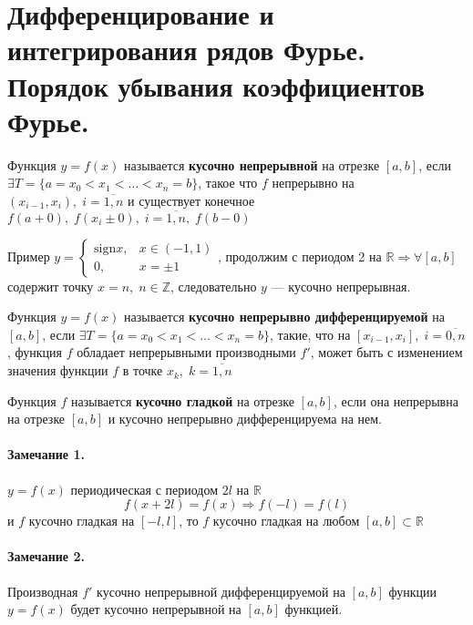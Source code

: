 \section{Дифференцирование и интегрирования рядов Фурье. Порядок убывания коэффициентов Фурье.}
\begin{greyDefinition}Функция $ y = f(x) $ называется \textbf{кусочно непрерывной} на отрезке $ [a,b] $, если $ \exists T = \{ a =x_0<x_1<\ldots<x_n=b \} $, такое что $ f $ непрерывно на $ (x_{i-1},x_i),\;i =\overline{1,n} $ и существует конечное $ f(a+0),\; f(x_i \pm 0),\; i =\overline{1,n},\; f(b-0) $
\end{greyDefinition}

Пример $y =  \begin{cases}
\text{sign}x, &x \in (-1,1)\\
0, &x = \pm 1 
\end{cases} $, продолжим с периодом 2 на $ \mathbb{R} \Rightarrow \forall [a,b]  $ содержит точку $ x = n,\; n \in \mathbb{Z} $, следовательно $ y $ --- кусочно непрерывная.

\begin{greyDefinition} Функция  $ y=f(x) $ называется \textbf{кусочно непрерывно дифференцируемой} на $ [a,b] $, если $ \exists T=\{ a=x_0<x_1<\ldots<x_n=b \} $, такие, что на $ [x_{i-1},x_i],\;i=\overline{0,n} $, функция $ f $ обладает непрерывными производными $ f' $, может быть с изменением значения функции $ f $ в точке $ x_k,\;k=\overline{1,n} $
\end{greyDefinition}
\begin{greyDefinition} Функция $ f $ называется \textbf{кусочно гладкой} на отрезке $ [a,b] $, если она непрерывна на отрезке $ [a,b] $ и кусочно непрерывно дифференцируема на нем.
\end{greyDefinition}

\paragraph{Замечание 1.} $ y=f(x) $ периодическая с периодом $ 2l $ на $ \mathbb{R} $
\[
	f(x+2l)=f(x) \Rightarrow f(-l) = f(l)
\]
и $ f $ кусочно гладкая на $ [-l,l] $, то $ f $ кусочно гладкая на любом $ [a,b] \subset \mathbb{R} $
\paragraph{Замечание 2.} Производная $ f' $ кусочно непрерывной дифференцируемой на $ [a,b] $ функции $ y = f(x) $ будет кусочно непрерывной на $ [a,b] $ функцией.
